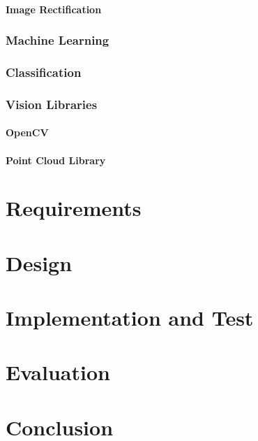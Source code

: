 \documentclass[11pt,oneside]{report}
\begin{document}
				\subsubsection{Image Rectification}
				
				
				
			\subsection{Machine Learning}%
			\subsection{Classification}
			\subsection{Vision Libraries}
				\subsubsection{OpenCV}
				\subsubsection{Point Cloud Library}
				
	\chapter{Requirements}
	\chapter{Design}
	\chapter{Implementation and Test}
	\chapter{Evaluation}
	\chapter{Conclusion}

	
	
\end{document}
